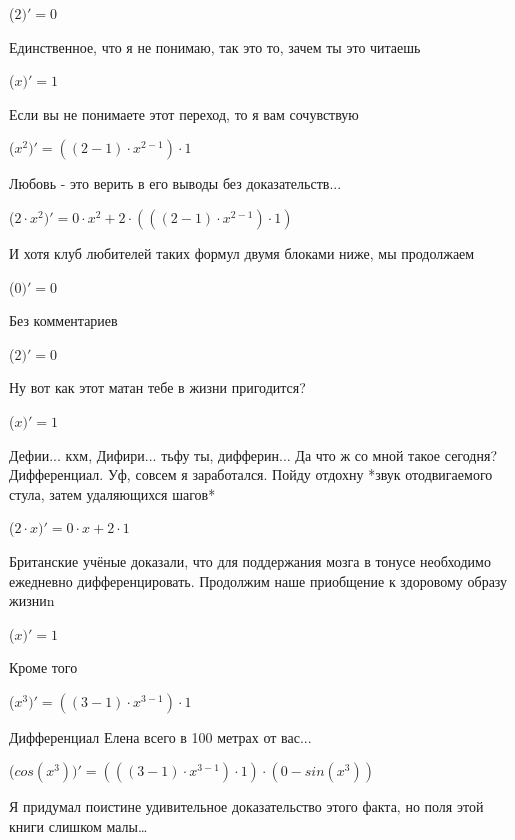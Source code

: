 \documentclass[12pt,a4paper,fleqn]{article}
\begin{document}
\begin{center}
 ($2)'
  = 0$\end{center}
Единственное, что я не понимаю, так это то, зачем ты это читаешь

\begin{center}
 ($x)'
  = 1$\end{center}
Если вы не понимаете этот переход, то я вам сочувствую

\begin{center}
 ($x^{2})'
  = ((2-1) \cdot x^{2-1}) \cdot 1$\end{center}
Любовь - это верить в его выводы без доказательств...

\begin{center}
 ($2 \cdot x^{2})'
  = 0 \cdot x^{2}+2 \cdot (((2-1) \cdot x^{2-1}) \cdot 1)$\end{center}
И хотя клуб любителей таких формул двумя блоками ниже, мы продолжаем

\begin{center}
 ($0)'
  = 0$\end{center}
Без комментариев\cite{link4}

\begin{center}
 ($2)'
  = 0$\end{center}
Ну вот как этот матан тебе в жизни пригодится?

\begin{center}
 ($x)'
  = 1$\end{center}
Дефии... кхм, Дифири... тьфу ты, дифферин... Да что ж со мной такое сегодня? Дифференциал. Уф, совсем я заработался. Пойду отдохну *звук отодвигаемого стула, затем удаляющихся шагов*

\begin{center}
 ($2 \cdot x)'
  = 0 \cdot x+2 \cdot 1$\end{center}
Британские учёные доказали, что для поддержания мозга в тонусе необходимо ежедневно дифференцировать. Продолжим наше приобщение к здоровому образу жизниn

\begin{center}
 ($x)'
  = 1$\end{center}
Кроме того

\begin{center}
 ($x^{3})'
  = ((3-1) \cdot x^{3-1}) \cdot 1$\end{center}
Дифференциал Елена всего в 100 метрах от вас...

\begin{center}
 ($cos(x^{3}))'
  = (((3-1) \cdot x^{3-1}) \cdot 1) \cdot (0-sin(x^{3}))$\end{center}
Я придумал поистине удивительное доказательство этого факта, но поля этой книги слишком малы\ldots
\end{document}
